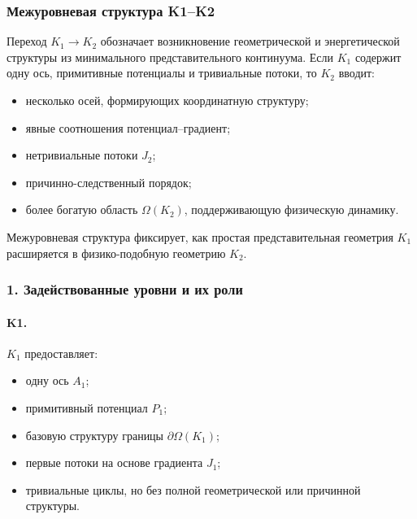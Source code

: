 
\subsubsection{Межуровневая структура K1–K2}
\label{sec:crossk-k1-k2}

Переход $K_1 \rightarrow K_2$ обозначает возникновение геометрической и
энергетической структуры из минимального представительного континуума.
Если $K_1$ содержит одну ось, примитивные потенциалы и тривиальные потоки,
то $K_2$ вводит:
\begin{itemize}
  \item несколько осей, формирующих координатную структуру;
  \item явные соотношения потенциал–градиент;
  \item нетривиальные потоки $J_2$;
  \item причинно-следственный порядок;
  \item более богатую область $\Omega(K_2)$, поддерживающую физическую
        динамику.
\end{itemize}

Межуровневая структура фиксирует, как простая представительная геометрия
$K_1$ расширяется в физико-подобную геометрию $K_2$.

\subsubsection{1. Задействованные уровни и их роли}

\paragraph{K1.}
$K_1$ предоставляет:
\begin{itemize}
  \item одну ось $A_1$;
  \item примитивный потенциал $P_1$;
  \item базовую структуру границы $\partial\Omega(K_1)$;
  \item первые потоки на основе градиента $J_1$;
  \item тривиальные циклы, но без полной геометрической или причинной
        структуры.
\end{itemize}


